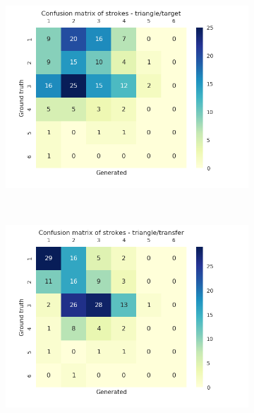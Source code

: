 \begin{figure}
        ~
        \begin{subfigure}[tb]{0.45\textwidth}
            \includegraphics[width=\textwidth]{images/sota/quickdraw_results/quickdraw_triangle_target_strokes_heatmap.png}
        \end{subfigure}
        ~
        \begin{subfigure}[tb]{0.45\textwidth}
            \includegraphics[width=\textwidth]{images/sota/quickdraw_results/quickdraw_triangle_transfer_strokes_heatmap.png}
        \end{subfigure}


\end{figure}
